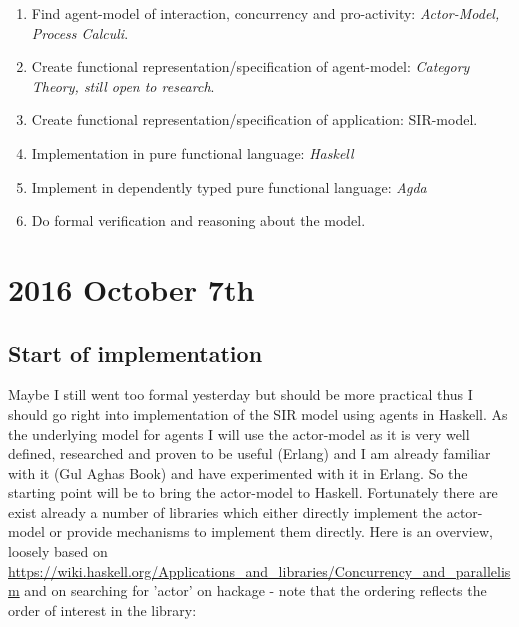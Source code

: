 \begin{enumerate}
\item Find agent-model of interaction, concurrency and pro-activity: \textit{Actor-Model, Process Calculi}.
\item Create functional representation/specification of agent-model: \textit{Category Theory, still open to research}.
\item Create functional representation/specification of application: SIR-model.
\item Implementation in pure functional language: \textit{Haskell}
\item Implement in dependently typed pure functional language: \textit{Agda}
\item Do formal verification and reasoning about the model.
\end{enumerate}


\section*{2016 October 7th}

\subsection*{Start of implementation}
Maybe I still went too formal yesterday but should be more practical thus I should go right into implementation of the SIR model using agents in Haskell. As the underlying model for agents I will use the actor-model as it is very well defined, researched and proven to be useful (Erlang) and I am already familiar with it (Gul Aghas Book) and have experimented with it in Erlang. So the starting point will be to bring the actor-model to Haskell. Fortunately there are exist already a number of libraries which either directly implement the actor-model or provide mechanisms to implement them directly. Here is an overview, loosely based on \url{https://wiki.haskell.org/Applications_and_libraries/Concurrency_and_parallelism} and on searching for 'actor' on hackage - note that the ordering reflects the order of interest in the library:

